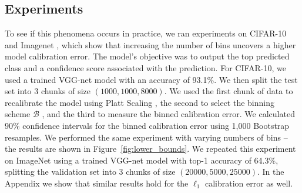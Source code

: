 \subsection{Experiments}

To see if this phenomena  occurs in practice, we ran experiments on CIFAR-10 and Imagenet , which show that  increasing the number of bins uncovers a higher model calibration error.
The model's objective was to output the top predicted class and a confidence score associated with the prediction.
For CIFAR-10, we used a trained VGG-net model  with an accuracy of 93.1\%.
We then split the test set into 3 chunks of size $(1000, 1000, 8000)$.
We used the first chunk of data to recalibrate the model using Platt Scaling , the second to select the binning scheme $\mathcal{B}$ , and the third to measure the binned calibration error.
We calculated $90\%$ confidence intervals for the binned calibration error using 1,000 Bootstrap  resamples.
We performed the same experiment with varying numbers of bins --
the results are shown in Figure~\ref{fig:lower_bounds}.
We repeated this experiment on ImageNet using a trained VGG-net model with top-1 accuracy of 64.3\%, splitting the validation set into 3 chunks of size $(20000, 5000, 25000)$.
In the Appendix we show that similar results hold for the $\ell_1$ calibration error as well.  

